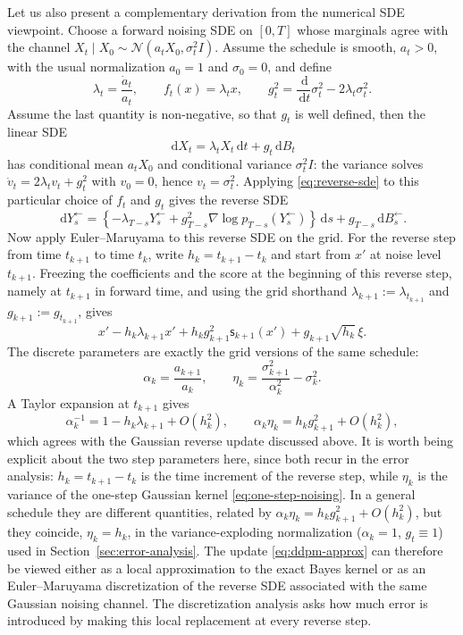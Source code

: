 \documentclass[10pt,a4paper]{amsart}
\numberwithin{equation}{section}
\newcommand{\dd}{\,\mathrm{d}}
\newcommand{\Id}{I}
\newcommand{\score}{\mathsf{s}}
\newcommand{\normal}[2]{\mathcal{N}\!\left(#1,#2\right)}
\begin{document}
Let us also present a complementary derivation from the numerical SDE viewpoint. Choose a
forward noising SDE on $[0,T]$ whose marginals agree with the channel
$X_t\mid X_0\sim\normal{a_tX_0}{\sigma_t^2\Id}$.  Assume the schedule is smooth,
$a_t>0$, with the usual normalization $a_0=1$ and $\sigma_0=0$, and define
\[
    \lambda_t=\frac{\dot a_t}{a_t},
    \qquad
    f_t(x)=\lambda_t x,
    \qquad
    g_t^2=\frac{\dd}{\dd t}\sigma_t^2-2\lambda_t\sigma_t^2.
\]
Assume the last quantity is non-negative, so that $g_t$ is well defined, then the linear SDE
\[
    \dd X_t=\lambda_tX_t\dd t+g_t\dd B_t
\]
has conditional mean $a_tX_0$ and conditional variance $\sigma_t^2\Id$:
the variance solves $\dot v_t=2\lambda_tv_t+g_t^2$ with $v_0=0$, hence
$v_t=\sigma_t^2$.  Applying \eqref{eq:reverse-sde} to this particular choice of
$f_t$ and $g_t$ gives the reverse SDE
\[
    \dd Y^{\leftarrow}_s
    =
    \left\{
    -\lambda_{T-s}Y^{\leftarrow}_s
    +
    g_{T-s}^2\nabla\log p_{T-s}(Y^{\leftarrow}_s)
    \right\}\dd s
    +
    g_{T-s}\dd B^{\leftarrow}_s.
\]
Now apply Euler--Maruyama to this reverse SDE on the grid.  For the
reverse step from time $t_{k+1}$ to time $t_k$, write
$h_k=t_{k+1}-t_k$ and start from $x'$ at noise level $t_{k+1}$.  Freezing the
coefficients and the score at the beginning of this reverse step, namely at
$t_{k+1}$ in forward time, and using the grid shorthand
$\lambda_{k+1}:=\lambda_{t_{k+1}}$ and $g_{k+1}:=g_{t_{k+1}}$, gives
\[
    x'
    -h_k\lambda_{k+1}x'
    +h_kg_{k+1}^2\score_{k+1}(x')
    +g_{k+1}\sqrt{h_k}\,\xi.
\]
The discrete parameters are exactly the grid versions of the same schedule:
\[
    \alpha_k=\frac{a_{k+1}}{a_k},
    \qquad
    \eta_k=\frac{\sigma_{k+1}^2}{\alpha_k^2}-\sigma_k^2.
\]
A Taylor expansion at $t_{k+1}$ gives
\[
    \alpha_k^{-1}
    =
    1-h_k\lambda_{k+1}+O(h_k^2),
    \qquad
    \alpha_k\eta_k
    =
    h_kg_{k+1}^2+O(h_k^2),
\]
which agrees with the Gaussian reverse update discussed above.
It is worth being explicit about the two step parameters here, since both recur
in the error analysis: $h_k=t_{k+1}-t_k$ is the time increment of the reverse
step, while $\eta_k$ is the variance of the one-step Gaussian kernel
\eqref{eq:one-step-noising}.  In a general schedule they are different
quantities, related by $\alpha_k\eta_k=h_kg_{k+1}^2+O(h_k^2)$, but they coincide,
$\eta_k=h_k$, in the variance-exploding normalization ($\alpha_k=1$,
$g_t\equiv1$) used in Section~\ref{sec:error-analysis}.
The update \eqref{eq:ddpm-approx} can therefore be viewed either as
a local approximation to the exact Bayes kernel or as an Euler--Maruyama
discretization of the reverse SDE associated with the same Gaussian noising
channel.  The discretization analysis asks how much error is introduced by
making this local replacement at every reverse step.
\end{document}
